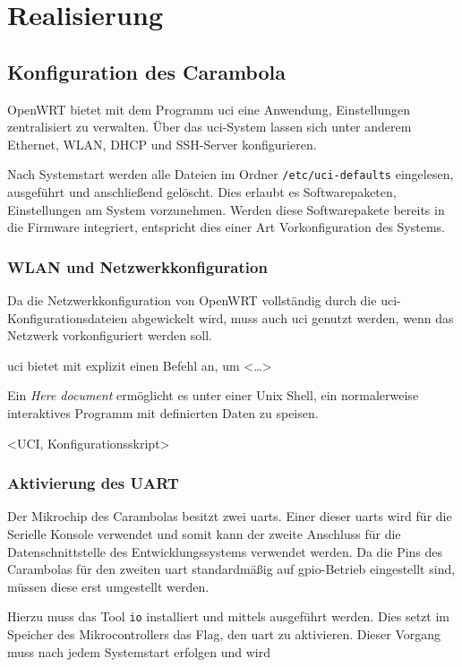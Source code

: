 \chapter{Realisierung}
\section{Konfiguration des Carambola}
OpenWRT bietet mit dem Programm \gls{uci} eine Anwendung,
Einstellungen zentralisiert zu verwalten. Über das \gls{uci}-System lassen sich
unter anderem Ethernet, WLAN, DHCP und SSH-Server konfigurieren.

Nach Systemstart werden alle Dateien im Ordner \texttt{/etc/uci-defaults}
eingelesen, ausgeführt und anschließend gelöscht. Dies erlaubt es
Softwarepaketen, Einstellungen am System vorzunehmen. Werden diese
Softwarepakete bereits in die Firmware integriert, entspricht dies einer Art
Vorkonfiguration des Systems.
\subsection{WLAN und Netzwerkkonfiguration}
Da die Netzwerkkonfiguration von OpenWRT vollständig durch die
\gls{uci}-Konfigurationsdateien abgewickelt wird, muss auch \gls{uci} genutzt
werden, wenn das Netzwerk vorkonfiguriert werden soll.

\gls{uci} bietet mit  explizit einen Befehl an, um <\ldots> 
\begin{definition}
Ein \emph{Here document} ermöglicht es unter einer Unix Shell, ein normalerweise
interaktives Programm mit definierten Daten zu speisen.
\end{definition}

 <UCI, Konfigurationsskript>
\subsection{Aktivierung des UART}
Der Mikrochip\cite{RA01} des Carambolas besitzt zwei \glspl{uart}. Einer dieser
\glspl{uart} wird für die Serielle Konsole verwendet und somit kann der zweite
Anschluss für die Datenschnittstelle des Entwicklungssystems verwendet werden.
Da die Pins des Carambolas für den zweiten \gls{uart} standardmäßig auf
\gls{gpio}-Betrieb eingestellt sind, müssen diese erst umgestellt werden.

Hierzu muss das Tool \texttt{io} installiert und mittels 
 ausgeführt werden. Dies setzt im Speicher des
Mikrocontrollers das Flag, den \gls{uart} zu aktivieren. Dieser Vorgang muss
nach jedem Systemstart erfolgen und wird 

